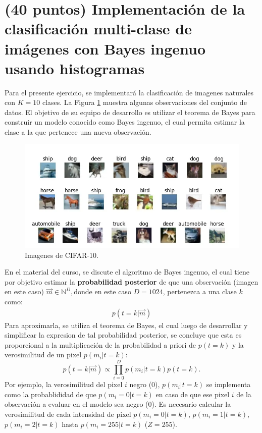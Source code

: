 \documentclass[spanish]{article}
\begin{document}
\section{(40 puntos) Implementaci\'{o}n de la clasificaci\'{o}n multi-clase
de im\'{a}genes con Bayes ingenuo usando histogramas}
\begin{myEnumerate}
\item Para el presente ejercicio, se implementar\'{a} la clasificaci\'{o}n
de imagenes naturales con $K=10$ clases. La Figura \ref{fig:Imagenes-de-CIFAR-10.}
muestra algunas observaciones del conjunto de datos. El objetivo de
su equipo de desarrollo es utilizar el teorema de Bayes para construir
un modelo conocido como Bayes ingenuo, el cual permita estimar la
clase a la que pertenece una nueva observaci\'{o}n.

\begin{figure}
\begin{centering}
\includegraphics[scale=0.7]{TP1_Bayes/Images/cifar10.png}
\par\end{centering}
\caption{Imagenes de CIFAR-10.\label{fig:Imagenes-de-CIFAR-10.}}

\end{figure}
\newpage

\item En el material del curso, se discute el algoritmo de Bayes ingenuo,
el cual tiene por objetivo estimar la \textbf{probabilidad posterior}
de que una observaci\'{o}n (imagen en este caso) $\overrightarrow{m}\in\mathbb{N}^{D},$donde
en este caso $D=1024$, pertenezca a una clase $k$ como:
\[
\begin{array}{c}
p\left(t=k|\overrightarrow{m}\right)\end{array}
\]
Para aproximarla, se utiliza el teorema de Bayes, el cual luego de
desarrollar y simplificar la expresion de tal probabilidad posterior,
se concluye que esta es proporcional a la multiplicaci\'{o}n de la
probabilidad a priori de $p\left(t=k\right)$ y la verosimilitud de
un pixel $p\left(m_{i}|t=k\right)$:
\[
p\left(t=k|\overrightarrow{m}\right)\propto\prod_{i=0}^{D}p\left(m_{i}|t=k\right)p\left(t=k\right).
\]
Por ejemplo, la verosimilitud del pixel $i$ negro (0), $p\left(m_{i}|t=k\right)$
se implementa como la probablididad de que $p\left(m_{i}=0|t=k\right)$
en caso de que ese pixel $i$ de la observaci\'{o}n a evaluar en el
modelo sea negro (0). Es necesario calcular la verosimilitud de cada
intensidad de pixel $p\left(m_{i}=0|t=k\right)$,
$p\left(m_{i}=1|t=k\right)$,$p\left(m_{i}=2|t=k\right)$
hasta $p\left(m_{i}=255|t=k\right)$ ($Z=255$).


\end{myEnumerate}
\end{document}
